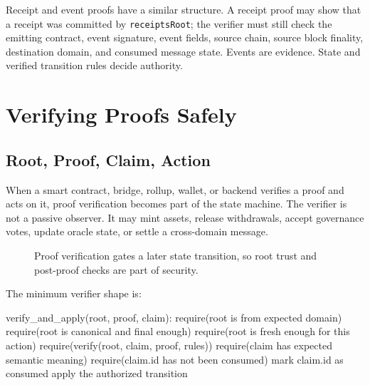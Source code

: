 Receipt and event proofs have a similar structure. A receipt proof may show that a receipt was committed by \texttt{receiptsRoot}; the verifier must still check the emitting contract, event signature, event fields, source chain, source block finality, destination domain, and consumed message state. Events are evidence. State and verified transition rules decide authority.

\section{Verifying Proofs Safely}

\subsection{Root, Proof, Claim, Action}

When a smart contract, bridge, rollup, wallet, or backend verifies a proof and acts on it, proof verification becomes part of the state machine. The verifier is not a passive observer. It may mint assets, release withdrawals, accept governance votes, update oracle state, or settle a cross-domain message.

\begin{figure}[htbp]
\centering
{}
\caption{Proof verification gates a later state transition, so root trust and post-proof checks are part of security.}
\end{figure}

The minimum verifier shape is:

\begin{codeblock}
verify_and_apply(root, proof, claim):
    require(root is from expected domain)
    require(root is canonical and final enough)
    require(root is fresh enough for this action)
    require(verify(root, claim, proof, rules))
    require(claim has expected semantic meaning)
    require(claim.id has not been consumed)
    mark claim.id as consumed
    apply the authorized transition
\end{codeblock}

